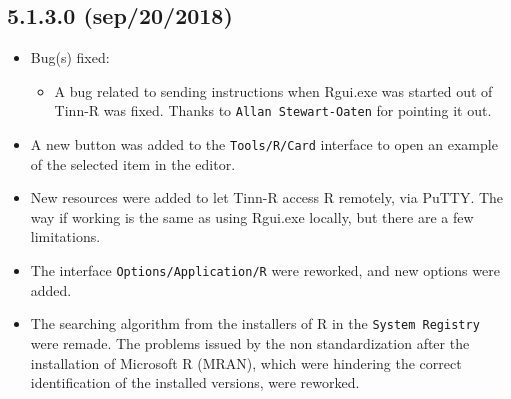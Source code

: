 \subsection*{5.1.3.0 (sep/20/2018)}
\begin{itemize}
  \item Bug(s) fixed:
    \begin{itemize}
      \item A bug related to sending instructions when Rgui.exe was started out of Tinn-R was fixed.
      Thanks to \texttt{Allan Stewart-Oaten} for pointing it out.
    \end{itemize}
  \item A new button was added to the \texttt{Tools/R/Card} interface to open an example of the selected item in the editor.
  \item New resources were added to let Tinn-R access R remotely, via PuTTY.
    The way if working is the same as using Rgui.exe locally, but there are a few limitations.
  \item The interface \texttt{Options/Application/R} were reworked, and new options were added.
  \item The searching algorithm from the installers of R in the \texttt{System Registry} were remade. The problems issued
    by the non standardization after the installation of Microsoft R (MRAN), which were hindering
    the correct identification of the installed versions, were reworked.
\end{itemize}